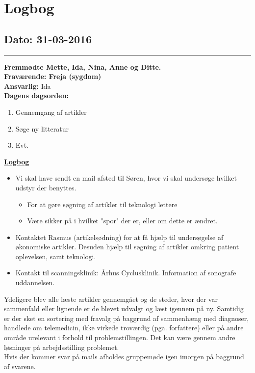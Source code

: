 \chapter{Logbog}
\section{Dato: 31-03-2016}
\hrule
\textbf{Fremmødte Mette, Ida, Nina, Anne og Ditte.} \\
\textbf{Fraværende: Freja (sygdom) } \\
\textbf{Ansvarlig:} Ida  \\
\textbf{Dagens dagsorden: }
\begin{enumerate}
	\item Gennemgang af artikler
	\item Søge ny litteratur
	\item Evt. 
\end{enumerate}

\underline{\textbf{Logbog}}
\begin{itemize}
\item Vi skal have sendt en mail afsted til Søren, hvor vi skal undersøge hvilket udstyr der benyttes.
\begin{itemize}
\item For at gøre søgning af artikler til teknologi lettere
\item Være sikker på i hvilket "spor" der er, eller om dette er ændret.
\end{itemize}
\item Kontaktet Rasmus (artikelsødning) for at få hjælp til undersøgelse af økonomiske artikler. Desuden hjælp til søgning af artikler omkring patient oplevelsen, samt teknologi. 
\item Kontakt til scanningsklinik: Århus Cyclusklinik. Information af sonografe uddannelsen. 
\end{itemize}

Ydeligere blev alle læste artikler gennemgået og de steder, hvor der var sammenfald eller lignende er de blevet udvalgt og læst igennem på ny. Samtidig er der sket en sortering med fravalg på baggrund af sammenhæng med diagnoser, handlede om telemedicin, ikke virkede troværdig (pga. forfattere) eller på andre område urelevant i forhold til problemstillingen. Det kan være gennem andre løsninger på arbejdsstilling problemet.  \\
\newline
Hvis der kommer svar på mails afholdes gruppemøde igen imorgen på baggrund af svarene. 
\newpage